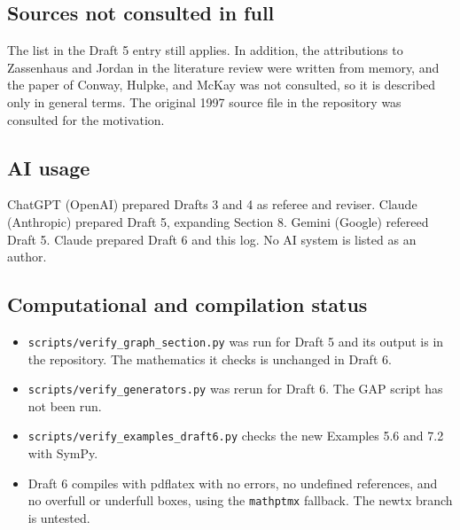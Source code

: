 \documentclass[12pt,letterpaper]{article}
\begin{document}
\subsection{Sources not consulted in full}
The list in the Draft 5 entry still applies. In addition, the attributions to Zassenhaus and Jordan in the literature review were written from memory, and the paper of Conway, Hulpke, and McKay was not consulted, so it is described only in general terms. The original 1997 source file in the repository was consulted for the motivation.

\subsection{AI usage}
ChatGPT (OpenAI) prepared Drafts 3 and 4 as referee and reviser. Claude (Anthropic) prepared Draft 5, expanding Section 8. Gemini (Google) refereed Draft 5. Claude prepared Draft 6 and this log. No AI system is listed as an author.

\subsection{Computational and compilation status}
\begin{itemize}
\item \texttt{scripts/verify\_graph\_section.py} was run for Draft 5 and its output is in the repository. The mathematics it checks is unchanged in Draft 6.
\item \texttt{scripts/verify\_generators.py} was rerun for Draft 6. The GAP script has not been run.
\item \texttt{scripts/verify\_examples\_draft6.py} checks the new Examples 5.6 and 7.2 with SymPy.
\item Draft 6 compiles with pdflatex with no errors, no undefined references, and no overfull or underfull boxes, using the \texttt{mathptmx} fallback. The newtx branch is untested.
\end{itemize}
\end{document}
